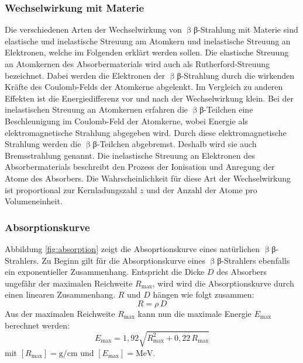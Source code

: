 \subsubsection{Wechselwirkung mit Materie}
Die verschiedenen Arten der Wechselwirkung von $\upbeta${β}-Strahlung mit Materie sind elastische und inelastische Streuung am Atomkern und inelastische Streuung an Elektronen, welche im Folgenden erklärt werden sollen.
Die elastische Streuung an Atomkernen des Absorbermaterials wird auch als Rutherford-Streuung bezeichnet. Dabei werden die Elektronen der $\upbeta${β}-Strahlung durch die wirkenden Kräfte des Coulomb-Felds der Atomkerne abgelenkt. Im Vergleich zu anderen Effekten ist die Energiedifferenz vor und nach der Wechselwirkung klein.
Bei der inelastischen Streuung an Atomkernen erfahren die $\upbeta${β}-Teilchen eine Beschleunigung im Coulomb-Feld der Atomkerne, wobei Energie als elektromagnetische Strahlung abgegeben wird. Durch diese elektromagnetische Strahlung werden die $\upbeta${β}-Teilchen abgebremst. Deshalb wird sie auch Bremsstrahlung genannt.
Die inelastische Streuung an Elektronen des Absorbermaterials beschreibt den Prozess der Ionisation und Anregung der Atome des Absorbers. Die Wahrscheinlichkeit für diese Art der Wechselwirkung ist proportional zur Kernladungszahl $z$ und der Anzahl der Atome pro Volumeneinheit.

\subsubsection{Absorptionskurve}
Abbildung \ref{fig:absorption} zeigt die Absoprtionskurve eines natürlichen $\upbeta${β}-Strahlers. Zu Beginn gilt für die Absorptionskurve eines $\upbeta${β}-Strahlers ebenfalls ein exponentieller Zusammenhang. Entspricht die Dicke $D$ des Absorbers ungefähr der maximalen Reichweite $R_\mathrm{max}$, wird wird die Absorptionskurve durch einen linearen Zusammenhang. $R$ und $D$ hängen wie folgt zusammen:
\begin{equation}
  R=\rho\,D
\end{equation}
Aus der maximalen Reichweite $R_\mathrm{max}$ kann nun die maximale Energie $E_\mathrm{max}$ berechnet werden:
\begin{equation}
  E_\mathrm{max} = 1,92 \sqrt{R_\mathrm{max}^2+0,22\,R_\mathrm{max}}
\end{equation}
mit $[R_\mathrm{max}]=\si{\gram\per\centi\meter}$ und $[E_\mathrm{max}]= \si{\mega\electronvolt}$.
